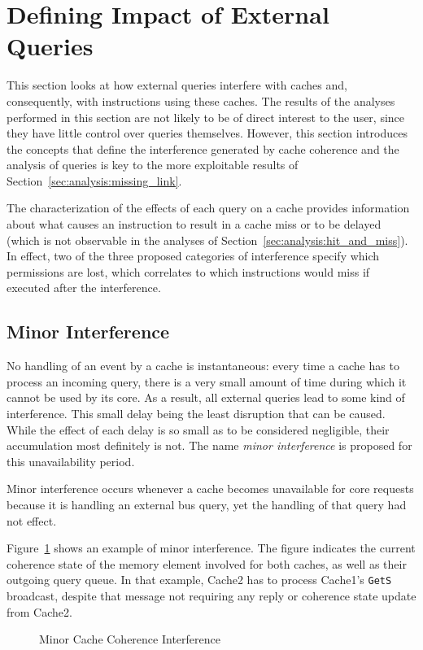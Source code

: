 \section{Defining Impact of External Queries}
\label{sec:analysis:exposing_interference}
This section looks at how external queries interfere with caches and,
consequently, with instructions using these caches. The results of the analyses
performed in this section are not likely to be of direct interest to the user,
since they have little control over queries themselves. However, this section
introduces the concepts that define the interference generated by cache
coherence and the analysis of queries is key to the more exploitable results
of Section~\ref{sec:analysis:missing_link}.

The characterization of the effects of each query on a cache provides
information about what causes an instruction to result in a cache miss or to be
delayed (which is not observable in the analyses of
Section~\ref{sec:analysis:hit_and_miss}). In effect, two of the three proposed
categories of interference specify which permissions are lost, which correlates
to which instructions would miss if executed after the interference.

\subsection{Minor Interference}
\label{sec:analysis:minor_interference}
No handling of an event by a cache is instantaneous: every time a cache has to
process an incoming query, there is a very small amount of time during which it
cannot be used by its core. As a result, all external queries lead to some kind
of interference. This small delay being the least disruption that can be
caused. While the effect of each delay is so small as to be considered
negligible, their accumulation most definitely is not.  The name \textit{minor
interference} is proposed for this unavailability period.

\begin{definition}
\label{def:interference:minor}
Minor interference occurs whenever a cache becomes unavailable for core requests
because it is handling an external bus query, yet the handling of that query
had not effect.
\end{definition}
\begin{example}
Figure~\ref{fig:minor-interference} shows an example of minor interference. The
figure indicates the current coherence state of the memory element involved for
both caches, as well as their outgoing query queue. In that example, Cache2
has to process Cache1's \texttt{GetS} broadcast, despite that
message not requiring any reply or coherence state update from Cache2.
\begin{figure}[hbt!]
\begin{center}
\end{center}
\caption{Minor Cache Coherence Interference}
\label{fig:minor-interference}
\end{figure}
\end{example}

